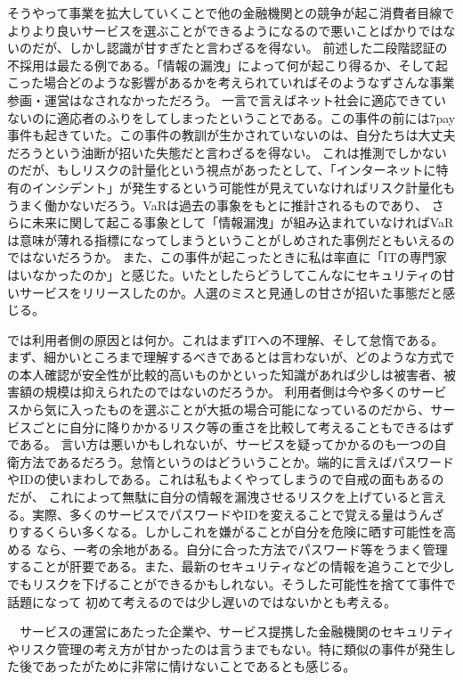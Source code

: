 \documentclass[11pt]{article}
\begin{document}
そうやって事業を拡大していくことで他の金融機関との競争が起こ消費者目線でよりより良いサービスを選ぶことができるようになるので悪いことばかりではないのだが、しかし認識が甘すぎたと言わざるを得ない。
前述した二段階認証の不採用は最たる例である。「情報の漏洩」によって何が起こり得るか、そして起こった場合どのような影響があるかを考えられていればそのようなずさんな事業参画・運営はなされなかっただろう。
一言で言えばネット社会に適応できていないのに適応者のふりをしてしまったということである。この事件の前には7pay事件も起きていた。この事件の教訓が生かされていないのは、自分たちは大丈夫だろうという油断が招いた失態だと言わざるを得ない。
これは推測でしかないのだが、もしリスクの計量化という視点があったとして、「インターネットに特有のインシデント」が発生するという可能性が見えていなければリスク計量化もうまく働かないだろう。VaRは過去の事象をもとに推計されるものであり、
さらに未来に関して起こる事象として「情報漏洩」が組み込まれていなければVaRは意味が薄れる指標になってしまうということがしめされた事例だともいえるのではないだろうか。
また、この事件が起こったときに私は率直に「ITの専門家はいなかったのか」と感じた。いたとしたらどうしてこんなにセキュリティの甘いサービスをリリースしたのか。人選のミスと見通しの甘さが招いた事態だと感じる。
\par では利用者側の原因とは何か。これはまずITへの不理解、そして怠惰である。
まず、細かいところまで理解するべきであるとは言わないが、どのような方式での本人確認が安全性が比較的高いものかといった知識があれば少しは被害者、被害額の規模は抑えられたのではないのだろうか。
利用者側は今や多くのサービスから気に入ったものを選ぶことが大抵の場合可能になっているのだから、サービスごとに自分に降りかかるリスク等の重さを比較して考えることもできるはずである。
言い方は悪いかもしれないが、サービスを疑ってかかるのも一つの自衛方法であるだろう。怠惰というのはどういうことか。端的に言えばパスワードやIDの使いまわしである。これは私もよくやってしまうので自戒の面もあるのだが、
これによって無駄に自分の情報を漏洩させるリスクを上げていると言える。実際、多くのサービスでパスワードやIDを変えることで覚える量はうんざりするくらい多くなる。しかしこれを嫌がることが自分を危険に晒す可能性を高める
なら、一考の余地がある。自分に合った方法でパスワード等をうまく管理することが肝要である。また、最新のセキュリティなどの情報を追うことで少しでもリスクを下げることができるかもしれない。そうした可能性を捨てて事件で話題になって
初めて考えるのでは少し遅いのではないかとも考える。
\par　サービスの運営にあたった企業や、サービス提携した金融機関のセキュリティやリスク管理の考え方が甘かったのは言うまでもない。特に類似の事件が発生した後であったがために非常に情けないことであるとも感じる。
\end{document}
